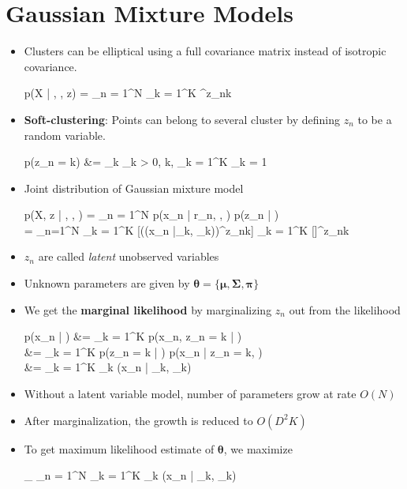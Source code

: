 
\section{Gaussian Mixture Models}
\begin{itemize}
	\item Clusters can be elliptical using a full covariance matrix instead of isotropic covariance.
	\begin{myalign*}
	    p(\*X | \bm \mu, \bm \Sigma, \*z) = \prod_{n = 1}^N \prod_{k = 1}^K 
		    ^{z_{nk}}
	\end{myalign*}

	\item \textbf{Soft-clustering}: Points can belong to several cluster by defining $z_n$ to be a random variable.
	\begin{myalign*}
		p(z_{n} = k) &= \pi_k  \pi_k > 0, \forall k, %
		\sum_{k = 1}^K \pi_k = 1
	\end{myalign*}
	\item Joint distribution of Gaussian mixture model
	\begin{myalign*}
	    p(\*X, \*z | \bm \mu, \bm \Sigma, \bm \pi)
	    = \prod_{n = 1}^N
	    	p(\*x_n | \*r_n, \bm \mu, \bm \Sigma) p(\*z_n | \bm \pi) \\
	    = \prod_{n=1}^N \prod_{k = 1}^K [(\N(\*x_n |\bm \mu_k, \bm \Sigma_k))^{z_{nk}}] \prod_{k = 1}^K [\pi]^{z_{nk}}
	\end{myalign*}
	\item $z_n$ are called \textit{latent} unobserved variables
	\item Unknown parameters are given by $ \bm \theta = \{\bm \mu, \bm \Sigma, \bm \pi\}$
	\item We get the \textbf{marginal likelihood} by marginalizing $z_n$ out from the likelihood
	\begin{myalign*}
	    p(\*x_n | \bm \theta) &= \sum_{k = 1}^K p(\*x_n, z_{n} = k | \bm \theta)\\
	    &= \sum_{k = 1}^K p(z_{n} = k | \bm \theta) p(\*x_n | z_{n} = k, \bm \theta)\\
	    &= \sum_{k = 1}^K \pi_k \N(\*x_n | \bm \mu_k, \bm \Sigma_k)
	\end{myalign*}
	\item Without a latent variable model, number of parameters grow at rate $O(N)$
	\item After marginalization, the growth is reduced to $O(D^2 K)$

	\item To get maximum likelihood estimate of $\bm \theta$, we maximize
	\begin{myalign*}
	    \max_{\bm \theta} \sum_{n = 1}^N \log \sum_{k = 1}^K \pi_k \N(\*x_n | \bm \mu_k, \bm \Sigma_k)
	\end{myalign*}
\end{itemize}

